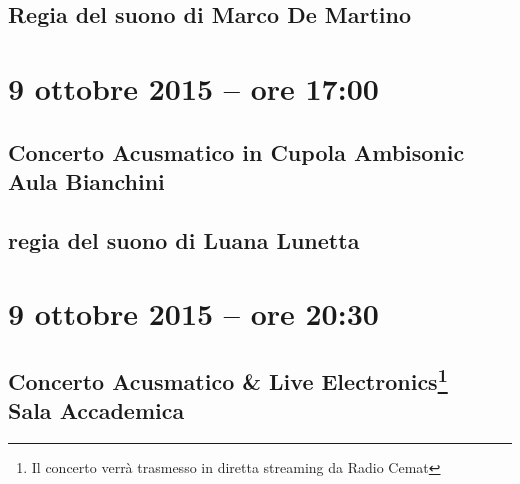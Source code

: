 \documentclass[8pt, twoside, a5paper]{extreport}
\begin{document}
{\fontsize{30}{30} }

\subsection*{\textsf{Regia del suono di Marco De Martino}}

\bigskip

\begin{multicols}{2}

%


\end{multicols}

\clearpage


\section*{9 ottobre 2015 -- ore 17:00}

\subsection*{{\small Concerto Acusmatico in Cupola Ambisonic} \\
	\textsf{Aula Bianchini}}

{\fontsize{30}{30} }

\subsection*{\textsf{regia del suono di Luana Lunetta}}

\bigskip

\begin{multicols}{2}

%


\end{multicols}

\clearpage

\section*{9 ottobre 2015 -- ore 20:30}

\subsection*{{\small Concerto Acusmatico \& Live Electronics\footnote{ Il concerto verrà trasmesso in diretta streaming da Radio Cemat}} \\
	\textsf{Sala Accademica}}
\end{document}
